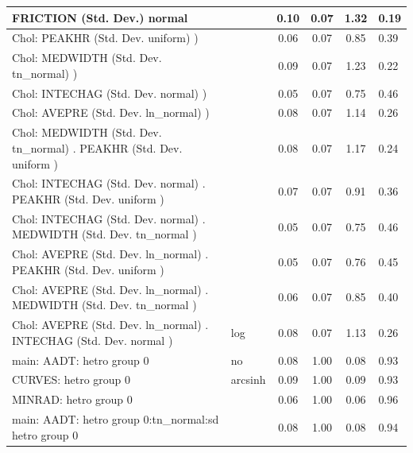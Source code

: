 \begin{table}
\begin{center}
\begin{tabular}{|l|l|c|c|c|l|}
			FRICTION (Std. Dev.) normal &  & 0.10 & 0.07 & 1.32 & 0.19 \\
			\hline
			 Chol: PEAKHR (Std. Dev. uniform) ) &  & 0.06 & 0.07 & 0.85 & 0.39 \\
			\hline
			 Chol: MEDWIDTH (Std. Dev. tn_normal) ) &  & 0.09 & 0.07 & 1.23 & 0.22 \\
			\hline
			 Chol: INTECHAG (Std. Dev. normal) ) &  & 0.05 & 0.07 & 0.75 & 0.46 \\
			\hline
			 Chol: AVEPRE (Std. Dev. ln_normal) ) &  & 0.08 & 0.07 & 1.14 & 0.26 \\
			\hline
			 Chol: MEDWIDTH (Std. Dev. tn_normal) . PEAKHR (Std. Dev.   uniform ) &  & 0.08 & 0.07 & 1.17 & 0.24 \\
			\hline
			 Chol: INTECHAG (Std. Dev. normal) . PEAKHR (Std. Dev.   uniform ) &  & 0.07 & 0.07 & 0.91 & 0.36 \\
			\hline
			 Chol: INTECHAG (Std. Dev. normal) . MEDWIDTH (Std. Dev.   tn_normal ) &  & 0.05 & 0.07 & 0.75 & 0.46 \\
			\hline
			 Chol: AVEPRE (Std. Dev. ln_normal) . PEAKHR (Std. Dev.   uniform ) &  & 0.05 & 0.07 & 0.76 & 0.45 \\
			\hline
			 Chol: AVEPRE (Std. Dev. ln_normal) . MEDWIDTH (Std. Dev.   tn_normal ) &  & 0.06 & 0.07 & 0.85 & 0.40 \\
			\hline
			 Chol: AVEPRE (Std. Dev. ln_normal) . INTECHAG (Std. Dev.   normal ) & log & 0.08 & 0.07 & 1.13 & 0.26 \\
			\hline
			main: AADT: hetro group 0 & no & 0.08 & 1.00 & 0.08 & 0.93 \\
			\hline
			CURVES: hetro group 0 & arcsinh & 0.09 & 1.00 & 0.09 & 0.93 \\
			\hline
			MINRAD: hetro group 0 &  & 0.06 & 1.00 & 0.06 & 0.96 \\
			\hline
			main: AADT: hetro group 0:tn_normal:sd  hetro group 0 &  & 0.08 & 1.00 & 0.08 & 0.94 \\
			\hline
		\end{tabular}
	\end{center}
\end{table}